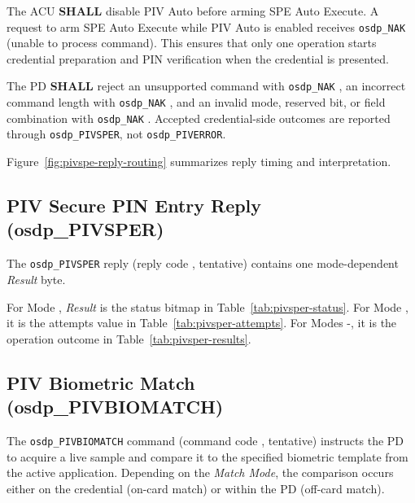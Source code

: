 The ACU \textbf{SHALL} disable PIV Auto before arming SPE Auto Execute. A request
to arm SPE Auto Execute while PIV Auto is enabled receives \texttt{osdp\_NAK} 
(unable to process command). This ensures that only one operation starts credential
preparation and PIN verification when the credential is presented.

The PD \textbf{SHALL} reject an unsupported command with \texttt{osdp\_NAK}
, an incorrect command length with \texttt{osdp\_NAK} ,
and an invalid mode, reserved bit, or field combination with
\texttt{osdp\_NAK} . Accepted credential-side outcomes are reported
through \texttt{osdp\_PIVSPER}, not \texttt{osdp\_PIVERROR}.

Figure~\ref{fig:pivspe-reply-routing} summarizes reply timing and interpretation.


\subsection{PIV Secure PIN Entry Reply (osdp\_PIVSPER)}

The \texttt{osdp\_PIVSPER} reply (reply code , tentative) contains
one mode-dependent \emph{Result} byte.



For Mode , \emph{Result} is the status bitmap in
Table~\ref{tab:pivsper-status}. For Mode , it is the attempts value
in Table~\ref{tab:pivsper-attempts}. For Modes -, it is
the operation outcome in Table~\ref{tab:pivsper-results}.







\subsection{PIV Biometric Match (osdp\_PIVBIOMATCH)}

The \texttt{osdp\_PIVBIOMATCH} command (command code , tentative) instructs the PD to acquire a live sample and compare it to the specified biometric template from the active application. Depending on the \emph{Match Mode}, the comparison occurs either on the credential (on-card match) or within the PD (off-card match).



